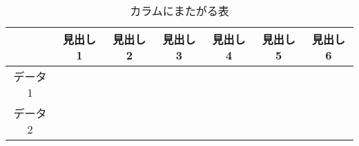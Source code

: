 \begin{table*}[tbh]
  \caption{カラムにまたがる表}
  \label{tab:sample2}
  \centering
    \begin{tabular}{c|cccccc} 
      & 見出し1 & 見出し2 & 見出し3 & 見出し4 & 見出し5 & 見出し6\\ \hline
      データ1 &  & \\
      データ2 &  & \\
      \hline \hline
    \end{tabular}
\end{table*}
